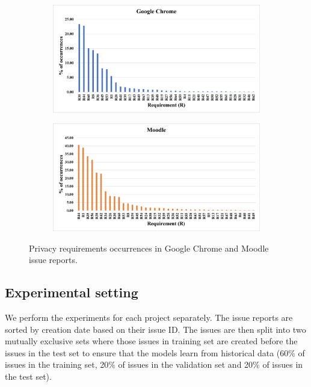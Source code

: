 \begin{figure}[ht]
	\centering
	\begin{subfigure}[b]{0.9\textwidth}
		\includegraphics[width=\textwidth]{"Figures/occ_chrome"}
	\end{subfigure}
	\hfill
	\begin{subfigure}[b]{0.9\textwidth}
		\includegraphics[width=\textwidth]{"Figures/occ_moodle"}
	\end{subfigure}
	\caption{Privacy requirements occurrences in Google Chrome and Moodle issue reports.}
	\label{fig:occ}
\end{figure}

\subsection{Experimental setting} \label{subsec:experimental-setting}

We perform the experiments for each project separately. The issue reports are sorted by creation date based on their issue ID. The issues are then split into two mutually exclusive sets where those issues in training set are created before the issues in the test set to ensure that the models learn from historical data (60\% of issues in the training set, 20\% of issues in the validation set and 20\% of issues in the test set).

